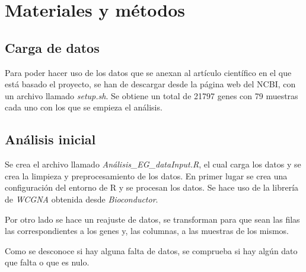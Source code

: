 \section{Materiales y métodos}
\subsection{Carga de datos}
Para poder hacer uso de los datos que se anexan al artículo científico en el que está basado el proyecto, se han de descargar desde la página web del NCBI, con un archivo llamado \textit{setup.sh}. Se obtiene un total de 21797 genes con 79 muestras cada uno con los que se empieza el análisis.

\subsection{Análisis inicial}
Se crea el archivo llamado \textit{Análisis\_EG\_dataInput.R}, el cual carga los datos y se crea la limpieza y preprocesamiento de los datos. En primer lugar se crea una configuración del entorno de R y se procesan los datos. Se hace uso de la librería de \textit{WCGNA} obtenida desde \textit{Bioconductor}. 

Por otro lado se hace un reajuste de datos, se transforman para que sean las filas las correspondientes a los genes y, las columnas, a las muestras de los mismos.

Como se desconoce si hay alguna falta de datos, se comprueba si hay algún dato que falta o que es nulo. 